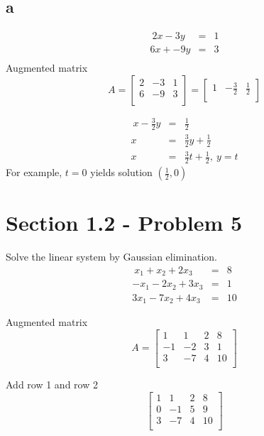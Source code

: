 \documentclass[a4paper,12pt]{report}
\begin{document}
\subsection*{a}
\begin{eqnarray*}
\ 2x -3y & = & 1\\
6x + -9y & = & 3\\
\end{eqnarray*}
Augmented matrix
\[
A 
=
\begin{bmatrix}
    2       & -3& 1 \\
    6       & -9 & 3 \\
\end{bmatrix}
=
\begin{bmatrix}
    1       & -\frac{3}{2} & \frac{1}{2} \\
\end{bmatrix}
\]

\begin{eqnarray*}
\ x -\frac{3}{2}y & = & \frac{1}{2}\\
x & = & \frac{3}{2}y+\frac{1}{2}\\
x & = & \frac{3}{2}t +\frac{1}{2},\: y=t
\end{eqnarray*}
For example, \(t=0\) yields solution \((\frac{1}{2},0)\)

\section*{Section 1.2 - Problem 5}
Solve the linear system by Gaussian elimination.
\begin{eqnarray*}
\ x_1 + x_2 +2x_3& = & 8\\
-x_1 - 2x_2 + 3x_3 & = & 1\\
3x_1 - 7x_2 + 4x_3 & = & 10
\end{eqnarray*}

Augmented matrix
\[
A 
=
\begin{bmatrix}
    1       & 1 & 2 & 8 \\
    -1       & -2 & 3  &1 \\
    3       & -7 & 4  &10 \\
\end{bmatrix}
\]

Add row 1 and row 2
\[
\begin{bmatrix}
    1       & 1 & 2 & 8 \\
    0       & -1 & 5  &9 \\
    3       & -7 & 4  &10 \\
\end{bmatrix}
\]
\end{document}
